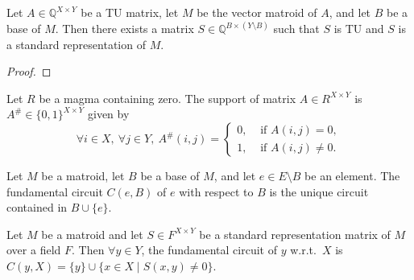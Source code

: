 
\begin{lemma}
    \label{VectorMatroid.exists_standardRepr_isBase_isTotallyUnimodular}
    \leanok
    Let $A \in \mathbb{Q}^{X \times Y}$ be a TU matrix, let $M$ be the vector matroid of $A$, and let $B$ be a base of $M$. Then there exists a matrix $S \in \mathbb{Q}^{B \times (Y \setminus B)}$ such that $S$ is TU and $S$ is a standard representation of $M$.
\end{lemma}

\begin{proof}
    \leanok
    \SeeLean
\end{proof}


\begin{definition}
    \label{Matrix.support}
    \leanok
    Let $R$ be a magma containing zero. The support of matrix $A \in R^{X \times Y}$ is $A^{\#} \in \{0, 1\}^{X \times Y}$ given by
    \[
        \forall i \in X, \ \forall j \in Y, \ A^{\#} (i, j) = \begin{cases}
            0, & \text{ if } A (i, j) = 0, \\
            1, & \text{ if } A (i, j) \neq 0.
        \end{cases}
    \]
\end{definition}

\begin{definition}
    \label{def:fund_circuit}
    Let $M$ be a matroid, let $B$ be a base of $M$, and let $e \in E \setminus B$ be an element. The fundamental circuit $C (e, B)$ of $e$ with respect to $B$ is the unique circuit contained in $B \cup \{e\}$.
\end{definition}

\begin{lemma}
    \label{lem:std_repr_fund_circuits}
    Let $M$ be a matroid and let $S \in F^{X \times Y}$ be a standard representation matrix of $M$ over a field $F$. Then $\forall y \in Y$, the fundamental circuit of $y$ w.r.t.~$X$ is $C (y, X) = \{y\} \cup \{x \in X \mid S (x, y) \neq 0\}$.
\end{lemma}


